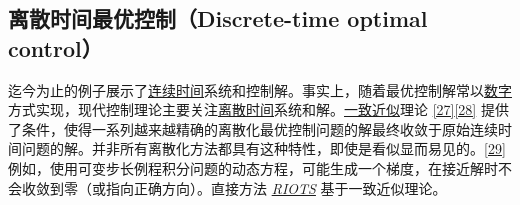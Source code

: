 \subsection{离散时间最优控制（Discrete-time optimal control）}

迄今为止的例子展示了\href{https://en.wikipedia.org/wiki/Continuous_time}{连续时间}系统和控制解。事实上，随着最优控制解常以\href{https://en.wikipedia.org/wiki/Digital_data}{数字}方式实现，现代控制理论主要关注\href{https://en.wikipedia.org/wiki/Discrete_time}{离散时间}系统和解。\href{https://en.wikipedia.org/w/index.php?title=Consistent_Approximations&action=edit&redlink=1}{一致近似}理论 \href{https://en.wikipedia.org/wiki/Optimal_control#cite_note-27}{[27]}\href{https://en.wikipedia.org/wiki/Optimal_control#cite_note-28}{[28]} 提供了条件，使得一系列越来越精确的离散化最优控制问题的解最终收敛于原始连续时间问题的解。并非所有离散化方法都具有这种特性，即使是看似显而易见的。\href{https://en.wikipedia.org/wiki/Optimal_control#cite_note-29}{[29]} 例如，使用可变步长例程积分问题的动态方程，可能生成一个梯度，在接近解时不会收敛到零（或指向正确方向）。直接方法 \emph{\href{http://www.schwartz-home.com/RIOTS}{RIOTS}} 基于一致近似理论。
